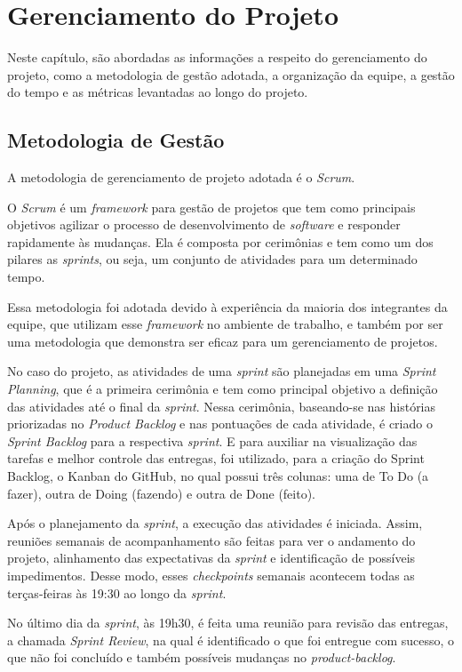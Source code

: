 \chapter{Gerenciamento do Projeto}
Neste capítulo, são abordadas as informações a respeito do gerenciamento do projeto, como a metodologia de gestão adotada, a organização da equipe, a gestão do tempo e as métricas levantadas ao longo do projeto.

\section{Metodologia de Gestão}
A metodologia de gerenciamento de projeto adotada é o \textit{Scrum}.

O \textit{Scrum} é um \textit{\gls{framework}} para gestão de projetos que tem como principais objetivos agilizar o processo de desenvolvimento de \textit{\gls{software}} e responder rapidamente às mudanças. Ela é composta por cerimônias e tem como um dos pilares as \textit{\glspl{sprint}}, ou seja, um conjunto de atividades para um determinado tempo. 

Essa metodologia foi adotada devido à experiência da maioria dos integrantes da equipe, que utilizam esse \textit{\gls{framework}} no ambiente de trabalho, e também por ser uma metodologia que demonstra ser eficaz para um gerenciamento de projetos.


No caso do projeto, as atividades de uma \textit{\gls{sprint}} são planejadas em uma \textit{Sprint Planning}, que é a primeira cerimônia e tem como principal objetivo a definição das atividades até o final da \textit{\gls{sprint}}. Nessa cerimônia, baseando-se nas histórias priorizadas no \textit{Product Backlog} e nas pontuações de cada atividade, é criado o \textit{Sprint Backlog} para a respectiva \textit{\gls{sprint}}. E para auxiliar na visualização das tarefas e melhor controle das entregas, foi utilizado, para a criação do Sprint Backlog, o Kanban do GitHub, no qual possui três colunas: uma de To Do (a fazer), outra de Doing (fazendo) e outra de Done (feito). 


Após o planejamento da \textit{\gls{sprint}}, a execução das atividades é iniciada. Assim, reuniões semanais de acompanhamento são feitas para ver o andamento do projeto, alinhamento das expectativas da \textit{\gls{sprint}} e identificação de possíveis impedimentos. Desse modo, esses \textit{\glspl{checkpoint}} semanais acontecem todas as terças-feiras às 19:30 ao longo da \textit{\gls{sprint}}. 

No último dia da \textit{\gls{sprint}}, às 19h30, é feita uma reunião para revisão das entregas, a chamada \textit{Sprint Review}, na qual é identificado o que foi entregue com sucesso, o que não foi concluído e também possíveis mudanças no \textit{\gls{product-backlog}}. 


